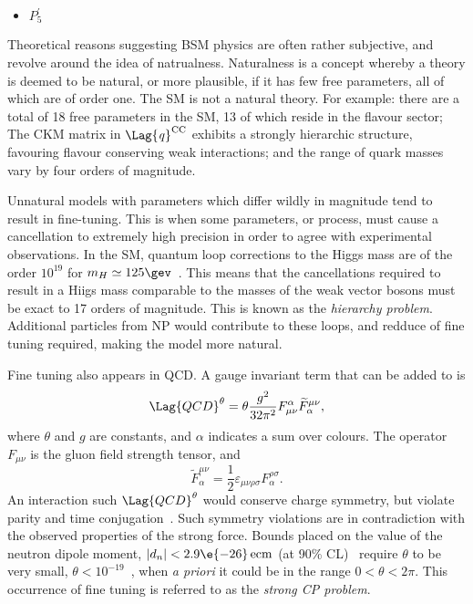 \begin{itemize}
  \item $P_5^\prime$
\end{itemize}




Theoretical reasons suggesting BSM physics
are often rather subjective, and revolve around the idea of natrualness.
Naturalness is a concept whereby a theory is deemed to be natural, or more plausible, if it has few
free parameters, all of which are of order one.
The SM is not a natural theory.
For example: there are a total of 18 free parameters in the SM, 13 of which reside in the flavour
sector;
The CKM matrix in $\Lag{\it q}^\mathrm{CC}$ exhibits a strongly hierarchic structure, favouring
flavour conserving weak interactions;
and the range of quark masses vary by four orders of magnitude.

Unnatural models with parameters which differ wildly in magnitude tend to result in fine-tuning.
This is when some parameters, or process, must cause a cancellation to extremely high precision in
order to agree with experimental observations.
In the SM, quantum loop corrections to the Higgs mass are of the order $10^{19}$
for $m_H\simeq125\gev$~\cite{Chatrchyan:2012ufa,Aad:2012tfa}.
This means that the cancellations required to result in a Hiigs mass comparable to the masses of
the weak vector bosons must be exact to 17 orders of magnitude.
This is known as the \emph{hierarchy problem}.
Additional particles from NP would contribute to these loops, and redduce of fine tuning required,
making the model more natural.

Fine tuning also appears in QCD.
A gauge invariant term that can be added to  is
\begin{equation}
  \Lag{QCD}^\theta = \theta\frac{g^2}{32\pi^2}
  F_{\mu\nu}^\alpha\widetilde F^{\mu\nu}_\alpha,
  \label{eq:strongcp}
\end{equation}
where $\theta$ and $g$ are constants, and $\alpha$ indicates a sum over colours.
The operator $F_{\mu\nu}$ is the gluon field strength tensor, and
\begin{equation}
  \widetilde F^{\mu\nu}_\alpha = \frac12\varepsilon_{\mu\nu\rho\sigma}F^{\rho\sigma}_\alpha.
\end{equation}
An interaction such $\Lag{QCD}^\theta$ would conserve charge symmetry, but violate parity and time
conjugation~\cite{Peccei:2006as}.
Such symmetry violations are in contradiction with the observed properties of the strong
force.
Bounds placed on the value of the neutron dipole moment, $|d_n| <2.9\e{-26}\,\mathrm{ecm}$
(at 90\% CL)~\cite{Baker:2006ts} require $\theta$ to be very small,
$\theta<10^{-19}$~\cite{Crewther:PQref9}, when \emph{a priori} it could be in the range
$0<\theta<2\pi$.
This occurrence of fine tuning is referred to as the \emph{strong CP problem}.

